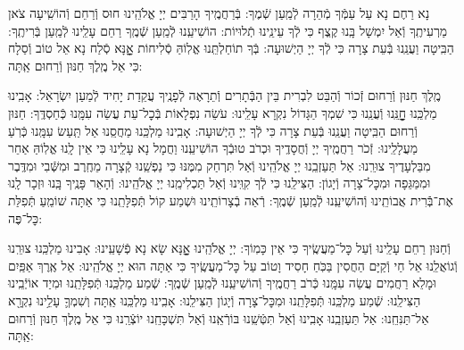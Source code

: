 \documentclass[twoside, openany, parskip=half, 11pt]{book}
\begin{document}
נָא רַחֶם נָא עַל עַמְּֿךָ מְֿהֵרָה לְֿמַֽעַן שְֿׁמֶךָ: בְּֿרַחֲמֶֽיךָ הָרַבִּים יְיָ אֱלֹהֵֽינוּ חוּס וְֿרַחֵם וְֿהוֹשִֽׁיעָה צֹאן מַרְעִיתֶֽךָ וְֿאַל יִמְשָׁל בָּֽנוּ קֶֽצֶף כִּי לְֿךָ עֵינֵֽינוּ תְֿלוּיוֹת: הוֹשִׁיעֵֽנוּ לְֿמַֽעַן שְֿׁמֶֽךָ רַחֵם עָלֵֽינוּ לְֿמַֽעַן בְּֿרִיתֶֽךָ: הַבִּֽיטָה וַעֲנֵֽנוּ בְּֿעֵת צָרָה כִּי לְֿךָ יְיָ הַיְשׁוּעָה: בְּֿךָ תוֹחַלְתֵּֽנוּ אֱלֽוֹהַּ סְֿלִיחוֹת אׇׇׇׇָנָּא סְֿלַח נָא אֵל טוֹב וְֿסַלָח כִּי אֵל מֶֽלֶךְ חַנּוּן וְֿרַחוּם אַֽתָּה:

מֶֽלֶךְ חַנּוּן וְֿרַחוּם זְֿכוֹר וְֿהַבֵּט לִבְרִית בֵּין הַבְּֿתָרִים וְֿתֵרָאֶה לְֿפָנֶֽיךָ עֲקֵדַת יָחִיד לְֿמַעַן יִשְׂרָאֵל: אָבִֽינוּ מַלְכֵּֽנוּ חׇׇׇׇׇׇׇׇָנֵּֽנוּ וְֿעֲנֵֽנוּ כִּי שִׁמְךָ הַגָּדוֹל נִקְרָא עָלֵֽינוּ: עֹשֵׂה נִפְלָאוֹת בְּֿכׇל־עֵת עֲשֵׂה עִמָּֽנוּ כְּֿחַסְדֶּֽךָ: חַנּוּן וְֿרַחוּם הַבִּֽיטָה וַעֲנֵֽנוּ בְּֿעֵת צָרָה כִּי לְֿךָ יְיָ הַיְשׁוּעָה: אָבִֽינוּ מַלְכֵּֽנוּ מַחֲסֵֽנוּ אַל תַּֽעַשׂ עִמָּֽנוּ כְּֿרֹֽעַ מַעֲלָלֵֽינוּ: זְֿכֹר רַחֲמֶֽיךָ יְיָ וְֿחֲסָדֶֽיךָ וּכְרֹב טוּבְֿךָ הוֹשִׁיעֵֽנוּ וַחֲמָל נָא עָלֵֽינוּ כִּי אֵין לָֽנוּ אֱלֽוֹהַּ אַחֵר מִבַּלְעָדֶיךָ צוּרֵֽנוּ: אַל תַּעַזְבֵֽנוּ יְיָ אֱלֹהֵֽינוּ וְֿאַל תִּרְחַק מִמֶּנּוּ כִּי נַפְשֵֽׁנוּ קְֿצָרָה מֵחֶֽרֶב וּמִשְּֿׁבִי וּמִדֶּֽבֶר וּמִמַּגֵּפָה וּמִכׇּל־צָרָה וְֿיָגוֹן: הַצִּילֵֽנוּ כִּי לְֿךָ קִוִּֽינוּ וְֿאַל תַּכְלִימֵֽנוּ יְיָ אֱלֹהֵֽינוּ: וְֿהָאֵר פָּנֶֽיךָ בָּֽנוּ וּזְכָר לָֽנוּ אֶת־בְּֿֿרִית אֲבוֹתֵֽינוּ וְֿהוֹשִׁיעֵֽנוּ לְֿמַֽעַן שְֿׁמֶֽךָ: רְֿאֵה בְֿצָרוֹתֵֽינוּ וּשְׁמַע קוֹל תְּֿפִלָּתֵֽנוּ כִּי אַתָּה שׁוֹמֵֽעַ תְּֿפִלַּת כׇּל־פֶּה:

וְֿחַנּוּן רַחֵם עָלֵֽינוּ וְֿעַל כׇּל־מַעֲשֶֽׂיךָ כִּי אֵין כָּמֽוֹךָ: יְיָ אֱלֹהֵֽינוּ אׇׇׇׇָנָּא שָׂא נָא פְֿשָׁעֵֽינוּ: אָבִינוּ מַלְכֵּֽנוּ צוּרֵֽנוּ וְֿגוֹאֲלֵֽנוּ אֵל חַי וְֿקַיָּם הַחֲסִין בַּכֹּֽחַ חָסִיד וָטוֹב עַל כׇּל־מַעֲשֶֽׂיךָ כִּי אַתָּה הוּא יְיָ אֱלֹהֵֽינוּ: אֵל אֶֽרֶךְ אַפַּֽיִם וּמָלֵא רַחֲמִים עֲשֵׂה עִמָּֽנוּ כְּֿרֹב רַחֲמֶֽיךָ וְֿהוֹשִׁיעֵֽנוּ לְֿמַֽעַן שְֿׁמֶֽךָ: שְֿׁמַע מַלְכֵּֽנוּ תְּֿפִלָּתֵֽנוּ וּמִיַד אוֹיְֿבֵֽינוּ הַצִּילֵֽנוּ: שְֿׁמַע מַלְכֵּֽנוּ תְּֿפִלָּתֵֽנוּ וּמִכׇּל־צָרָה וְֿיָגוֹן הַצִּילֵֽנוּ: אָבִֽינוּ מַלְכֵּֽנוּ אַֽתָּה וְשִׁמְךָ֛ עָלֵ֥ינוּ נִקְרָ֖א אַל־תַּנִּחֵֽנוּ: אַל תַּעַזְבֵֽנוּ אָבִֽינוּ וְֿאַל תִּטְּֿשֵֽׁנוּ בּוֹרְֿאֵֽנוּ וְֿאַל תִּשְׁכָּחֵֽנוּ יוֹצְֿרֵֽנוּ כִּי אֵל מֶֽלֶךְ חַנּוּן וְֿרַחוּם אַֽתָּה:
\end{document}

